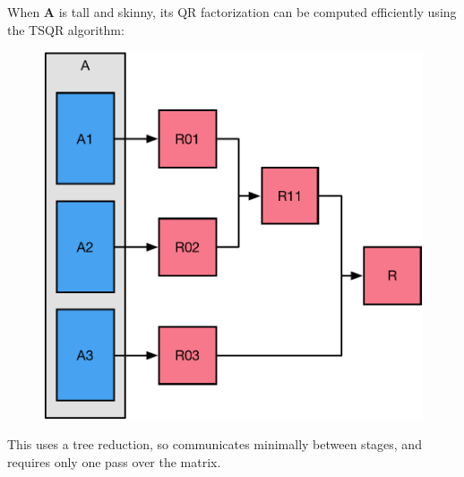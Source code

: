 \documentclass[xcolor=x11names,compress,ignorenonframetext,10pt]{beamer}
\renewcommand{\(}{\begin{columns}}
\renewcommand{\)}{\end{columns}}
\newcommand{\<}[1]{\begin{column}{#1}}
\renewcommand{\>}{\end{column}}
\begin{document}
\begin{frame}
When $\mathbf{A}$ is tall and skinny, its QR factorization can be computed efficiently using the TSQR algorithm:
\begin{figure}[h!]
\includegraphics[height=.7\textheight]{figures/spark/tsqr}
\end{figure}
This uses a tree reduction, so communicates minimally between stages, and requires only one pass over the matrix.
\end{frame}
\end{document}
